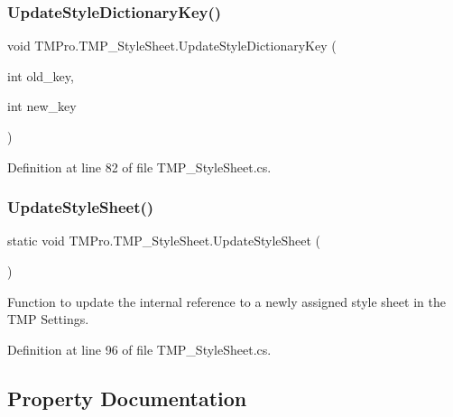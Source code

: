 \subsubsection{\texorpdfstring{UpdateStyleDictionaryKey()}{UpdateStyleDictionaryKey()}}
{\footnotesize\ttfamily void T\+M\+Pro.\+T\+M\+P\+\_\+\+Style\+Sheet.\+Update\+Style\+Dictionary\+Key (\begin{DoxyParamCaption}\item[{int}]{old\+\_\+key,  }\item[{int}]{new\+\_\+key }\end{DoxyParamCaption})}



Definition at line 82 of file T\+M\+P\+\_\+\+Style\+Sheet.\+cs.

\mbox{\label{class_t_m_pro_1_1_t_m_p___style_sheet_a4bab3ca47934d537b41ae066eabac404}} 
\subsubsection{\texorpdfstring{UpdateStyleSheet()}{UpdateStyleSheet()}}
{\footnotesize\ttfamily static void T\+M\+Pro.\+T\+M\+P\+\_\+\+Style\+Sheet.\+Update\+Style\+Sheet (\begin{DoxyParamCaption}{ }\end{DoxyParamCaption})\hspace{0.3cm}{\ttfamily [static]}}



Function to update the internal reference to a newly assigned style sheet in the T\+MP Settings. 



Definition at line 96 of file T\+M\+P\+\_\+\+Style\+Sheet.\+cs.



\subsection{Property Documentation}
\mbox{\label{class_t_m_pro_1_1_t_m_p___style_sheet_aa857b610ca839ac49f96ac6bc66ac201}} 

